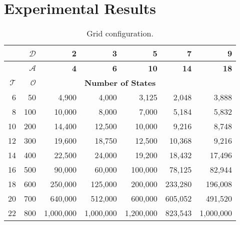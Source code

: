 \documentclass[letterpaper]{article} %
\begin{document}
\section{Experimental Results}
\begin{table*}[htb]
\centering
\begin{tabular}{rr|rrrrr}
\toprule

&\textbf{$\mathcal{D}$}& \multicolumn{1}{r}{\textbf{2} } & \multicolumn{1}{r}{\textbf{3} }  & \multicolumn{1}{r}{\textbf{5} } &  \multicolumn{1}{r}{\textbf{7} }& \multicolumn{1}{r}{\textbf{9} }\\ 
\midrule
&\textbf{$\mathcal{A}$}& \multicolumn{1}{r}{\textbf{4} } & \multicolumn{1}{r}{\textbf{6} } & \multicolumn{1}{r}{\textbf{10} } &  \multicolumn{1}{r}{\textbf{14} }& \multicolumn{1}{r}{\textbf{18} }\\ 
\midrule
\textbf{$\mathcal{T}$} & \textbf{$\mathcal{O}$}  &&\multicolumn{3}{l}{\textbf{Number of States}}\\
\midrule
        6   &50      &4,900	    &4,000       &3,125        &2,048	    &3,888       \\
        8   &100     &10,000     &8,000   	&7,000	     &5,184	    &5,832      	\\
        10  &200     &14,400	    &12,500	    &10,000	     &9,216	   &8,748	    		\\
        12  &300     &19,600	    &18,750		&12,500	     &10,368     &9,216     \\
        14  &400     &22,500     &24,000	    &19,200      &18,432&17,496	    	    	\\
        16  &500     &90,000	    &60,000	    &100,000	    &78,125&82,944	    	    	\\
        18  &600     &250,000	&125,000     &200,000	    &233,280&196,008	    	   	\\
		20  &700     &640,000	&512,000	    &600,000	     &605,052&491,520        	\\
		22  &800     &1,000,000	&1,000,000	&1,200,000	  &823,543&1,000,000      	\\
\bottomrule
\end{tabular}
\caption{Grid configuration.}
\label{tab:configuration}
\end{table*}
\end{document}
